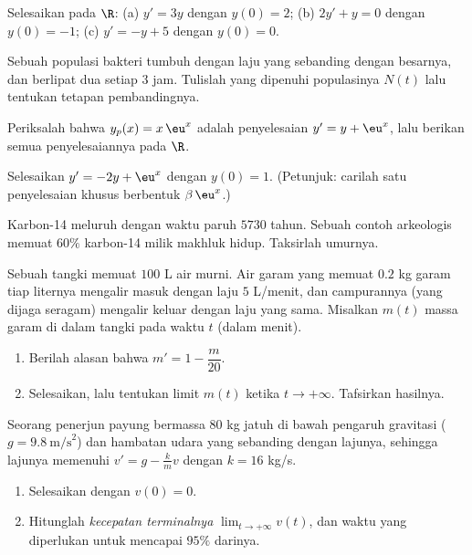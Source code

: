 \begin{exercise}[$\star$]\label{exo:g12:diffeq:1}
Selesaikan pada $\R$:
(a) $y' = 3y$ dengan $y(0) = 2$;\quad
(b) $2y' + y = 0$ dengan $y(0) = -1$;\quad
(c) $y' = -y + 5$ dengan $y(0) = 0$.
\end{exercise}

\begin{exercise}[$\star$]\label{exo:g12:diffeq:2}
Sebuah populasi bakteri tumbuh dengan laju yang sebanding dengan besarnya, dan
berlipat dua setiap $3$ jam. Tulislah  yang dipenuhi
populasinya $N(t)$ lalu tentukan tetapan pembandingnya.
\end{exercise}

\begin{exercise}[$\star$]\label{exo:g12:diffeq:3}
Periksalah bahwa $y_p(x) = x\,\eu^{x}$ adalah penyelesaian $y' = y + \eu^x$, lalu
berikan semua penyelesaiannya pada $\R$.
\end{exercise}

\begin{exercise}[$\star\star$]\label{exo:g12:diffeq:4}
Selesaikan $y' = -2y + \eu^{x}$ dengan $y(0) = 1$.
(Petunjuk: carilah satu penyelesaian khusus berbentuk $\beta\,\eu^{x}$.)
\end{exercise}

\begin{exercise}[$\star\star$]\label{exo:g12:diffeq:5}
Karbon-14 meluruh dengan waktu paruh $5730$ tahun. Sebuah contoh arkeologis
memuat $60\%$ karbon-14 milik makhluk hidup. Taksirlah umurnya.
\end{exercise}

\begin{exercise}[$\star\star$]\label{exo:g12:diffeq:6}
Sebuah tangki memuat $100$ L air murni. Air garam yang memuat $0.2$ kg garam
tiap liternya mengalir masuk dengan laju $5$ L/menit, dan campurannya (yang
dijaga seragam) mengalir keluar dengan laju yang sama. Misalkan $m(t)$ massa
garam di dalam tangki pada waktu $t$ (dalam menit).
\begin{enumerate}
  \item Berilah alasan bahwa $m' = 1 - \dfrac{m}{20}$.
  \item Selesaikan, lalu tentukan limit $m(t)$ ketika $t \to +\infty$.
        Tafsirkan hasilnya.
\end{enumerate}
\end{exercise}

\begin{exercise}[$\star\star$]\label{exo:g12:diffeq:7}
Seorang penerjun payung bermassa $80$ kg jatuh di bawah pengaruh gravitasi
($g = 9.8\ \text{m/s}^2$) dan hambatan udara yang sebanding dengan lajunya,
sehingga lajunya memenuhi $v' = g - \frac{k}{m}v$ dengan $k = 16$ kg/s.
\begin{enumerate}
  \item Selesaikan  dengan $v(0) = 0$.
  \item Hitunglah \emph{kecepatan terminalnya} $\lim_{t\to+\infty} v(t)$, dan
        waktu yang diperlukan untuk mencapai $95\%$ darinya.
\end{enumerate}
\end{exercise}

